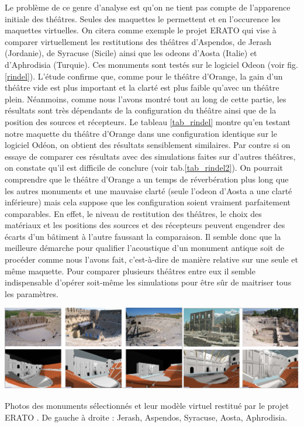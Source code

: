 Le problème de ce genre d'analyse est qu'on ne tient pas compte de l'apparence initiale des théâtres. Seules des maquettes le permettent et en l'occurence les maquettes virtuelles. On citera comme exemple le projet ERATO \cite{rindel} qui vise à comparer virtuellement les restitutions des théâtres d'Aspendos, de Jerash (Jordanie), de Syracuse (Sicile) ainsi que les \glspl{odeon} d'Aosta (Italie) et d'Aphrodisia (Turquie). Ces monuments sont testés sur le logiciel Odeon (voir fig. \ref{rindel}). L'étude confirme que, comme pour le théâtre d'Orange, la gain d'un théâtre vide est plus important et la clarté est plus faible qu'avec un théâtre plein. Néanmoins, comme nous l'avons montré tout au long de cette partie, les résultats sont très dépendants de la configuration du théâtre ainsi que de la position des sources et récepteurs. Le tableau \ref{tab_rindel} montre qu'en testant notre maquette du théâtre d'Orange dans une configuration identique sur le logiciel Odéon, on obtient des résultats sensiblement similaires. Par contre si on essaye de comparer ces résultats avec des simulations faites sur d'autres théâtres, on constate qu'il est difficile de conclure (voir tab.\ref{tab_rindel2}). On pourrait comprendre que le théâtre d'Orange a un temps de réverbération plus long que les autres monuments et une mauvaise clarté (seule l'\gls{odeon} d'Aosta a une clarté inférieure) mais cela suppose que les configuration soient vraiment parfaitement comparables. En effet, le niveau de restitution des théâtres, le choix des matériaux et les positions des sources et des récepteurs peuvent engendrer des écarts d'un bâtiment à l'autre faussant la comparaison. Il semble donc que la meilleure démarche pour qualifier l'acoustique d'un monument antique soit de procéder comme nous l'avons fait, c'est-à-dire de manière relative sur une seule et même maquette. Pour comparer plusieurs théâtres entre eux il semble indispensable d'opérer soit-même les simulations pour être sûr de maitriser tous les paramètres. 
%
\begin{figureth}
	\includegraphics[width=\linewidth]{images/rindel}
	\caption[Photos des monuments sélectionnés et leur modèle virtuel restitué par le projet ERATO.]{Photos des monuments sélectionnés et leur modèle virtuel restitué par le projet ERATO \footnotemark. De gauche à droite : Jerash, Aspendos, Syracuse, Aosta, Aphrodisia.}
	\label{rindel}
\end{figureth}
